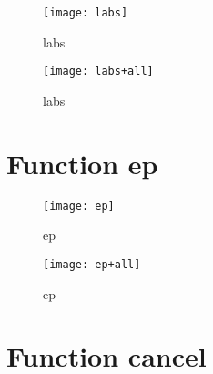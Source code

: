 \begin{center}

\end{center}

\begin{figure}[h]
\begin{center}
\texttt{[image: labs]}
\caption{labs}
\end{center}
\end{figure}

\begin{figure}[h]
\begin{center}
\texttt{[image: labs+all]}
\caption{labs}
\end{center}
\end{figure}

\newpage

\section{Function ep}

\begin{center}

\end{center}

\begin{center}

\end{center}

\begin{figure}[h]
\begin{center}
\texttt{[image: ep]}
\caption{ep}
\end{center}
\end{figure}

\begin{figure}[h]
\begin{center}
\texttt{[image: ep+all]}
\caption{ep}
\end{center}
\end{figure}

\newpage

\section{Function cancel}

\begin{center}

\end{center}

\begin{center}

\end{center}

